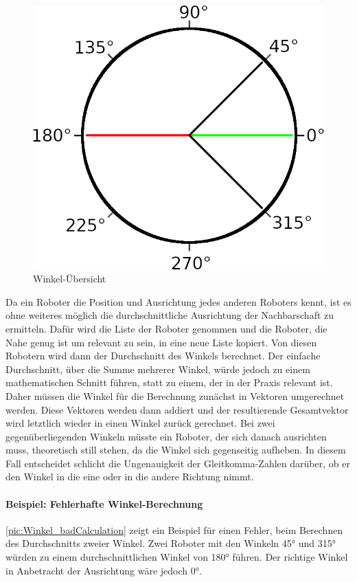 \begin{figure}
	\includegraphics[width=\pictureWidthSmall,keepaspectratio]{graphics/Winkel_badCalculation.png}
	\caption{Winkel-Übersicht}
	\label{pic:Winkel_badCalculation}
\end{figure}

Da ein Roboter die Position und Ausrichtung jedes anderen Roboters kennt, ist es ohne weiteres möglich die durchschnittliche Ausrichtung der Nachbarschaft zu ermitteln. Dafür wird die Liste der Roboter genommen und die Roboter, die Nahe genug ist um relevant zu sein, in eine neue Liste kopiert. Von diesen Robotern wird dann der Durchschnitt des Winkels berechnet. Der einfache Durchschnitt, über die Summe mehrerer Winkel, würde jedoch zu einem mathematischen Schnitt führen, statt zu einem, der in der Praxis relevant ist. Daher müssen die Winkel für die Berechnung zunächst in Vektoren umgerechnet werden. Diese Vektoren werden dann addiert und der resultierende Gesamtvektor wird letztlich wieder in einen Winkel zurück gerechnet. Bei zwei gegenüberliegenden Winkeln müsste ein Roboter, der sich danach ausrichten muss, theoretisch still stehen, da die Winkel sich gegenseitig aufheben. In diesem Fall entscheidet schlicht die Ungenauigkeit der Gleitkomma-Zahlen darüber, ob er den Winkel in die eine oder in die andere Richtung nimmt.

\paragraph*{Beispiel: Fehlerhafte Winkel-Berechnung}
\autoref{pic:Winkel_badCalculation} zeigt ein Beispiel für einen Fehler, beim Berechnen des Durchschnitts zweier Winkel. Zwei Roboter mit den Winkeln 45° und 315° würden zu einem durchschnittlichen Winkel von 180° führen. Der richtige Winkel in Anbetracht der Ausrichtung wäre jedoch 0°.
 

